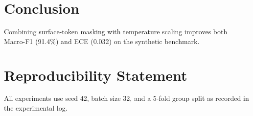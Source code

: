 \documentclass[10pt]{article}
\begin{document}
\section{Conclusion}
\label{sec:conclusion}
Combining surface-token masking with temperature scaling improves both Macro-F1 (91.4\%) and ECE (0.032) on the synthetic benchmark.

\section*{Reproducibility Statement}
All experiments use seed 42, batch size 32, and a 5-fold group split as recorded in the experimental log.



\end{document}
